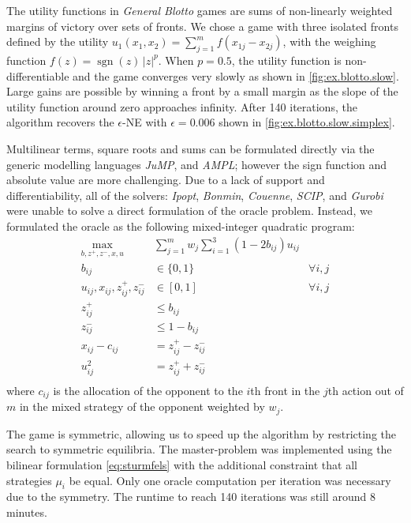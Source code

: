 \begin{example}\label{ex:do.slow.blotto}
  The utility functions in \emph{General Blotto} games are sums of non-linearly weighted margins of victory over sets of fronts. We chose a game with three isolated fronts defined by the utility $u_1(x_1, x_2) = \sum_{j=1}^m f\left( x_{1j} - x_{2j} \right)$, with the weighing function $f(z) = \operatorname{sgn}(z)\,|z|^p$. When $p=0.5$, the utility function is non-differentiable and the game converges very slowly as shown in \cref{fig:ex.blotto.slow}. Large gains are possible by winning a front by a small margin as the slope of the utility function around zero approaches infinity. After 140 iterations, the algorithm recovers the $\epsilon$-NE with $\epsilon=0.006$ shown in \cref{fig:ex.blotto.slow.simplex}.

  Multilinear terms, square roots and sums can be formulated directly via the generic modelling languages \emph{JuMP}, and \emph{AMPL}; however the sign function and absolute value are more challenging. Due to a lack of support and differentiability, all of the solvers: \emph{Ipopt}, \emph{Bonmin}, \emph{Couenne}, \emph{SCIP}, and \emph{Gurobi} were unable to solve a direct formulation of the oracle problem. Instead, we formulated the oracle as the following mixed-integer quadratic program:
  \[
  \begin{aligned}
  \max_{b,z^+,z^-,x,u} \quad& \sum_{j=1}^m w_j \sum_{i=1}^3 (1-2b_{ij})u_{ij} \\
  b_{ij} &\in \{0,1\} \quad&\forall i,j\\
  u_{ij},x_{ij},z^+_{ij},z^-_{ij} &\in [0,1] \quad&\forall i,j\\
  z^+_{ij} &\leq b_{ij} \\
  z^-_{ij} &\leq 1-b_{ij} \\
  x_{ij} - c_{ij} &= z^+_{ij} - z^-_{ij} \\
  u_{ij}^2 &=  z^+_{ij} + z^-_{ij} \\
  \end{aligned}
  \]
  where $c_{ij}$ is the allocation of the opponent to the $i$th front in the $j$th action out of $m$ in the mixed strategy of the opponent weighted by $w_j$.

  The game is symmetric, allowing us to speed up the algorithm by restricting the search to symmetric equilibria. The master-problem was implemented using the bilinear formulation \eqref{eq:sturmfels} with the additional constraint that all strategies $\mu_i$ be equal. Only one oracle computation per iteration was necessary due to the symmetry. The runtime to reach 140 iterations was still around 8 minutes.


\end{example}

